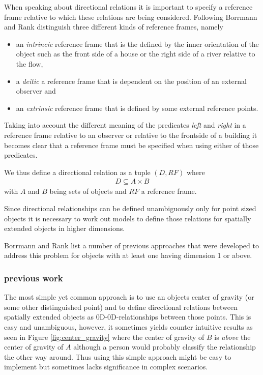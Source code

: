 \documentclass[paper=a4, fontsize=11pt]{scrartcl} %
\numberwithin{equation}{section} %
\numberwithin{figure}{section} %
\numberwithin{table}{section} %
\begin{document}
When speaking about directional relations it is important to specify a reference frame relative to which these relations are being considered. Following \cite{Retz-Schmidt:1988:VVS:46184.46189} Borrmann and Rank \cite{Borrmann:2009:AEI} distinguish three different kinds of reference frames, namely
\begin{itemize}
\item an \emph{intrincic} reference frame that is the defined by the inner orientation of the object such as the front side of a house or the right side of a river relative to the flow,
\item a \emph{deitic} a reference frame that is dependent on the position of an external observer and 
\item an \emph{extrinsic} reference frame that is defined by some external reference points. 
\end{itemize}

Taking into account the different meaning of the predicates \emph{left} and \emph{right} in a reference frame relative to an observer or relative to the frontside of a building it becomes clear that a reference frame must be specified when using either of those predicates.

We thus define a directional relation as a tuple $(D,RF)$ where  
\begin{align*}
  D \subseteq A \times B 
\end{align*}
with $A$ and $B$ being sets of objects and $RF$ a reference frame.

Since directional relationships can be defined unambiguously only for point sized objects it is necessary to work out models to define those relations for spatially extended objects in higher dimensions. 

Borrmann and Rank \cite{Borrmann:2009:AEI} list a number of previous approaches that were developed to address this problem for objects with at least one having dimension 1 or above.

\subsubsection{previous work}\label{sec:previous-work}
The most simple yet common approach is to use an objects center of gravity (or some other distinguished point) and to define directional relations between spatially extended objects as 0D-0D-relationships between those points. This is easy and unambiguous, however, it sometimes yields counter intuitive results as seen in Figure \ref{fig:center_gravity} where the center of gravity of $B$ is \emph{above} the center of gravity of $A$ although a person would probably classify the relationship the other way around. Thus using this simple approach might be easy to implement but sometimes lacks significance in complex scenarios.
\end{document}
